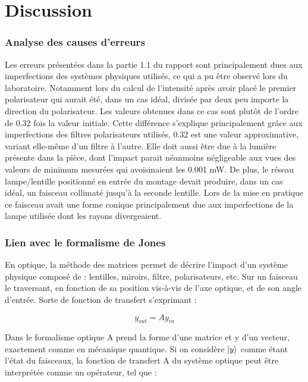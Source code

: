 \documentclass[11pt,letterpaper]{article}
\begin{document}
\section{Discussion}

\subsubsection{Analyse des causes d'erreurs}

 Les erreurs présentées dans la partie 1.1 du rapport sont principalement dues aux imperfections des systèmes physiques utilisés, ce qui a pu être observé lors du laboratoire. Notamment lors du calcul de l'intensité après avoir placé le premier polarisateur qui aurait été, dans un cas idéal, divisée par deux peu importe la direction du polarisateur. Les valeurs obtenues dans ce cas sont plutôt de l'ordre de 0.32 fois la valeur initiale. Cette différence s'explique principalement grâce aux imperfections des filtres polarisateurs utilisés, 0.32 est une valeur approximative, variant elle-même d'un filtre à l'autre. Elle doit aussi être due à la lumière présente dans la pièce, dont l'impact parait néanmoins négligeable aux vues des valeurs de minimum mesurées qui avoisinaient les 0.001 mW. De plus, le réseau lampe/lentille positionné en entrée du montage devait produire, dans un cas idéal, un faisceau collimaté jusqu'à la seconde lentille. Lors de la mise en pratique ce faisceau avait une forme conique principalement due aux imperfections de la lampe utilisée dont les rayons divergeaient.

\subsubsection{Lien avec le formalisme de Jones}

En optique, la méthode des matrices permet de décrire l'impact d'un système physique composé de : lentilles, miroirs, filtre, polarisateurs, etc. Sur un faisceau le traversant, en fonction de sa position vis-à-vis de l'axe optique, et de son angle d'entrée. Sorte de fonction de transfert s'exprimant : 

\begin{equation*}
    y_{out} = Ay_{in}
\end{equation*}

Dans le formalisme optique A prend la forme d'une matrice et y d'un vecteur, exactement comme en mécanique quantique. Si on considère $\ket{y}$ comme étant l'état du faisceaux, la fonction de transfert A du système optique peut être interprétée comme un opérateur, tel que : 
\end{document}
